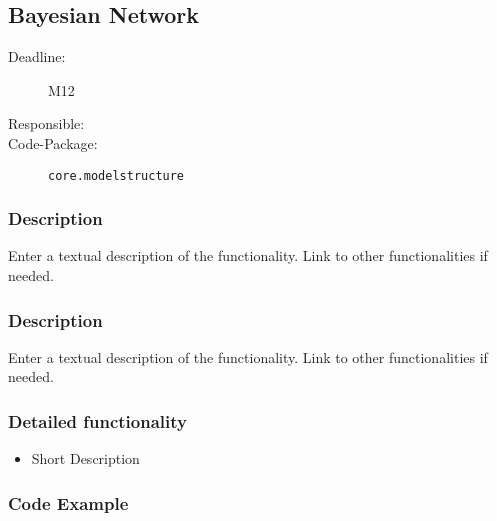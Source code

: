 \newpage
\subsection{Bayesian Network}
\label{Functionality:ID}

\begin{description}
\item[Deadline:] M12
\item[Responsible:] 
\item[Code-Package:] \texttt{core.modelstructure}
\end{description}

\subsubsection*{Description}

Enter a textual description of the functionality. Link to other functionalities if needed. 

\subsubsection*{Description}

Enter a textual description of the functionality. Link to other functionalities if needed. 

\subsubsection*{Detailed functionality}

\begin{itemize}
\item Short Description
\end{itemize}

\subsubsection*{Code Example}
